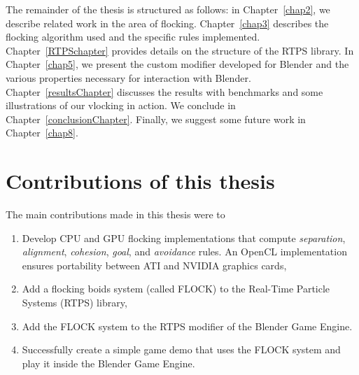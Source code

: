 
The remainder of the thesis is structured as follows:  in Chapter~\ref{chap2}, we describe related work in the area of flocking. Chapter~\ref{chap3} describes the flocking algorithm used and the specific rules implemented. Chapter~\ref{RTPSchapter} provides details on the structure of the RTPS library. In Chapter~\ref{chap5}, we present the custom modifier developed for Blender and the various properties necessary for interaction with Blender. Chapter~\ref{resultsChapter} discusses the results with benchmarks and some illustrations of our vlocking in action. We conclude in Chapter~\ref{conclusionChapter}.  Finally, we suggest some future work in Chapter~\ref{chap8}. 

\section{Contributions of this thesis}
The main contributions made in this thesis were to
\begin{enumerate}
\item Develop CPU and GPU flocking implementations that compute \textit{separation}, \textit{alignment}, \textit{cohesion}, \textit{goal}, and \textit{avoidance} rules. An OpenCL implementation ensures portability between ATI and NVIDIA graphics cards,
\item Add a flocking boids system (called FLOCK) to the Real-Time Particle Systems (RTPS) library,
\item Add the FLOCK system to the RTPS modifier of the Blender Game Engine.
\item Successfully create a simple game demo that uses the FLOCK system and play it inside the Blender Game Engine.
\end{enumerate}
